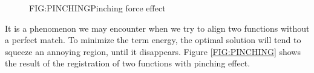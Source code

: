 


 \begin{figure}[Pinching force effect]{FIG:PINCHING}{Pinching force effect}
    \quad
 \end{figure}

It is a phenomenon we may encounter when we try to align two functions without a
perfect match. To minimize the term energy, the optimal solution will tend to
squeeze an annoying region, until it disappears. Figure \ref{FIG:PINCHING}
shows the result of the registration of two functions with pinching effect.